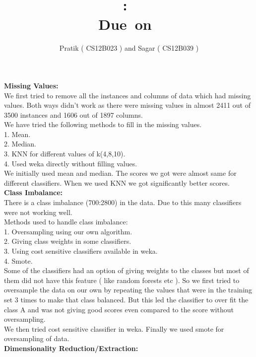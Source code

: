 \documentclass{article}
\title{
\textmd{\textbf{\hmwkClass:\ \hmwkTitle}}\\
\normalsize\vspace{0.1in}\small{Due\ on\ \hmwkDueDate}\\
}
\author{\textbf{\hmwkAuthorName}}
\date{Pratik ( CS12B023 ) and Sagar ( CS12B039 )} %
\begin{document}
\maketitle
{\bf Missing Values:}\\

We first tried to remove all the instances and columns of data which had missing values. Both ways didn't work as there were missing values in almost 2411 out of 3500 instances and 1606 out of 1897 columns.\\
We have tried the following methods to fill in the missing values.\\
1. Mean.\\
2. Median.\\
3. KNN for different values of k(4,8,10).\\
4. Used weka directly without filling values.\\

We initially used mean and median. The scores we got were almost same for different classifiers. When we used KNN we got significantly better scores.\\

{\bf Class Imbalance:}\\

There is a class imbalance (700:2800) in the data. Due to this many classifiers were not working well.\\
Methods used to handle class imbalance:\\
1. Oversampling using our own algorithm.\\
2. Giving class weights in some classifiers.\\
3. Using cost sensitive classifiers available in weka.\\
4. Smote.\\

Some of the classifiers had an option of giving weights to the classes but most of them did not have this feature ( like random forests etc ). So we first tried to oversample the data on our own by repeating the values that were in the training set 3 times to make that class balanced. But this led the classifier to over fit the class A and was not giving good scores even compared to the score without oversampling.\\
We then tried cost sensitive classifier in weka. Finally we used smote for oversampling of data.\\

{\bf Dimensionality Reduction/Extraction:}\\
\end{document}
